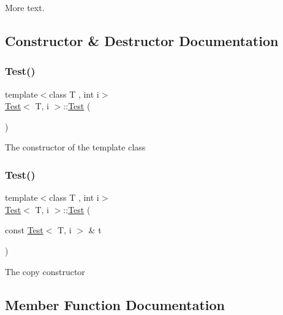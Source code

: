 More text. 

\subsection{Constructor \& Destructor Documentation}
\mbox{\label{class_test_a44e3a28c552193de099601e2910531f1}} 
\subsubsection{\texorpdfstring{Test()}{Test()}\hspace{0.1cm}{\footnotesize\ttfamily [1/2]}}
{\footnotesize\ttfamily template$<$class T , int i$>$ \\
\mbox{\hyperlink{class_test}{Test}}$<$ T, i $>$\+::\mbox{\hyperlink{class_test}{Test}} (\begin{DoxyParamCaption}{ }\end{DoxyParamCaption})}

The constructor of the template class \mbox{\label{class_test_adcf1bc755df94c4d07519c0a02aa1cc0}} 
\subsubsection{\texorpdfstring{Test()}{Test()}\hspace{0.1cm}{\footnotesize\ttfamily [2/2]}}
{\footnotesize\ttfamily template$<$class T , int i$>$ \\
\mbox{\hyperlink{class_test}{Test}}$<$ T, i $>$\+::\mbox{\hyperlink{class_test}{Test}} (\begin{DoxyParamCaption}\item[{const \mbox{\hyperlink{class_test}{Test}}$<$ T, i $>$ \&}]{t }\end{DoxyParamCaption})}

The copy constructor 

\subsection{Member Function Documentation}
\mbox{\label{class_test_a32a5254aa4ef1b634875e8680c76cc49}} 

